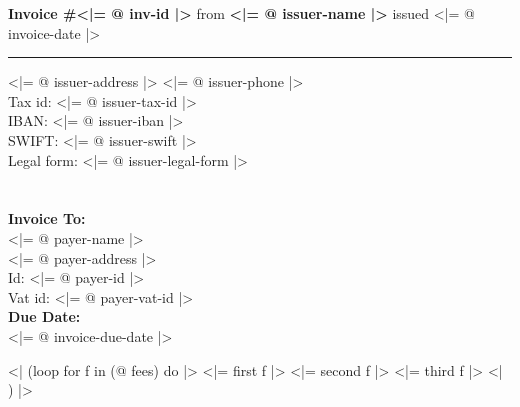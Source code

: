 \documentclass{invoice}
\def \tab {\hspace*{3ex}}
\begin{document}
\hfill{\Huge\bf Invoice \#<|= @ inv-id |>}\hfill
\bigskip\break
{\large from \bf <|= @ issuer-name |>}
\hfill issued <|= @ invoice-date |> \\
\hrule

<|= @ issuer-address |>
\hfill <|= @ issuer-phone |> \\
\tab Tax id: <|= @ issuer-tax-id |> \\
\tab IBAN: <|= @ issuer-iban |> \\
\tab SWIFT: <|= @ issuer-swift |> \\
\tab Legal form: <|= @ issuer-legal-form |> \\
\\ \\
{\bf Invoice To:} \\
\tab <|= @ payer-name |> \\
\tab <|= @ payer-address |> \\
\tab Id: <|= @ payer-id |> \\
\tab Vat id: <|= @ payer-vat-id |> \\

{\bf Due Date:} \\
\tab <|= @ invoice-due-date |> \\


\begin{invoiceTable}

<| (loop for f in (@ fees) do |>
\hourrow
  {<|= first f |>}
  {<|= second f |>}
  {<|= third f |>}
<| ) |>

\subtotal

\end{invoiceTable}
\end{document}
